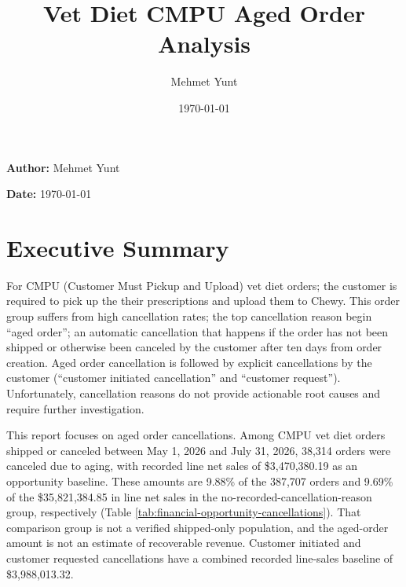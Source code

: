\documentclass[
  10pt,
]{article}
\title{Vet Diet CMPU Aged Order Analysis}
\author{Mehmet Yunt}
\date{\today}
\newif\ifreportfinal
\begin{document}
\thispagestyle{plain}
\ifreportfinal\else
{}\par\smallskip
\fi
{}\par
\noindent\textbf{Author:} Mehmet Yunt\par
\noindent\textbf{Date:} \today\par\medskip
\section{Executive Summary}\label{abstract}

For CMPU (Customer Must Pickup and Upload) vet diet orders; the
customer is required to pick up the their prescriptions and upload
them to Chewy. This order group suffers from high cancellation rates;
the top cancellation reason begin ``aged order''; an automatic
cancellation that happens if the order has not been shipped or
otherwise been canceled by the customer after ten days from order
creation. Aged order cancellation is followed by explicit
cancellations by the customer (``customer initiated cancellation'' and
``customer request''). Unfortunately, cancellation reasons
do not provide actionable root causes and require further
investigation.

This report focuses on aged order cancellations. Among CMPU vet diet
orders shipped or canceled between May 1, 2026 and July 31, 2026,
38,314 orders were canceled due to aging, with recorded line net sales
of \$3,470,380.19 as an opportunity baseline. These amounts are 9.88\%
of the 387,707 orders and 9.69\% of the \$35,821,384.85 in line net sales
in the no-recorded-cancellation-reason group, respectively (Table
\ref{tab:financial-opportunity-cancellations}). That comparison group
is not a verified shipped-only population, and the aged-order amount
is not an estimate of recoverable revenue. Customer initiated and
customer requested cancellations have a combined recorded line-sales
baseline of \$3,988,013.32.
\end{document}
